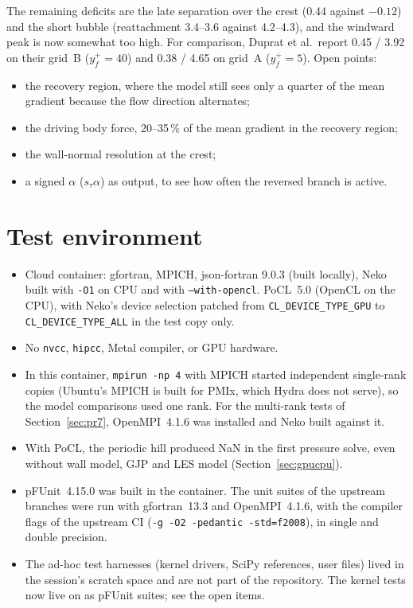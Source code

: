 \documentclass[11pt,a4paper]{article}
\newcommand{\code}[1]{\texttt{#1}}
\begin{document}
The remaining deficits are the late separation over the crest (0.44
against $-0.12$) and the short bubble (reattachment 3.4--3.6 against 4.2--4.3),
and the windward peak is now somewhat too high. For comparison, Duprat et
al.\ report 0.45 / 3.92 on their grid~B ($y^+_f = 40$) and 0.38 / 4.65 on
grid~A ($y^+_f = 5$). Open points:
\begin{itemize}
  \item the recovery region, where the model still sees only a quarter of
    the mean gradient because the flow direction alternates;
  \item the driving body force, 20--35\,\% of the mean gradient in the
    recovery region;
  \item the wall-normal resolution at the crest;
  \item a signed $\alpha$ ($s_\tau\alpha$) as output, to see how often the
    reversed branch is active.
\end{itemize}

\section{Test environment}

\begin{itemize}
  \item Cloud container: gfortran, MPICH, json-fortran 9.0.3 (built
    locally), Neko built with \code{-O1} on CPU and with
    \code{--with-opencl}. PoCL~5.0 (OpenCL on the CPU), with Neko's device
    selection patched from \code{CL\_DEVICE\_TYPE\_GPU} to
    \code{CL\_DEVICE\_TYPE\_ALL} in the test copy only.
  \item No \code{nvcc}, \code{hipcc}, Metal compiler, or GPU hardware.
  \item In this container, \code{mpirun -np 4} with MPICH started
    independent single-rank copies (Ubuntu's MPICH is built for PMIx, which
    Hydra does not serve), so the model comparisons used one rank. For the
    multi-rank tests of Section~\ref{sec:pr7}, OpenMPI~4.1.6 was installed
    and Neko built against it.
  \item With PoCL, the periodic hill produced NaN in the first pressure
    solve, even without wall model, GJP and LES model
    (Section~\ref{sec:gpucpu}).
  \item pFUnit~4.15.0 was built in the container. The unit suites of the
    upstream branches were run with gfortran~13.3 and OpenMPI~4.1.6, with the
    compiler flags of the upstream CI (\code{-g -O2 -pedantic -std=f2008}),
    in single and double precision.
  \item The ad-hoc test harnesses (kernel drivers, SciPy references, user
    files) lived in the session's scratch space and are not part of the
    repository. The kernel tests now live on as pFUnit suites; see the open
    items.
\end{itemize}
\end{document}
